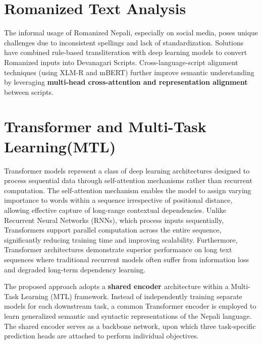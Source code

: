\section{Romanized Text Analysis}
The informal usage of Romanized Nepali, especially on social media, poses unique challenges due to inconsistent spellings and lack of standardization. Solutions have combined rule-based transliteration with deep learning models to convert Romanized inputs into Devanagari Scripts. Cross-language-script alignment techniques (using XLM-R and mBERT) further improve semantic understanding by leveraging \textbf{multi-head cross-attention and representation alignment} between scripts.


\section{Transformer and Multi-Task Learning(MTL)}
Transformer models represent a class of deep learning architectures designed to process sequential data through self-attention mechanisms rather than recurrent computation. The self-attention mechanism enables the model to assign varying importance to words within a sequence irrespective of positional distance, allowing effective capture of long-range contextual dependencies. Unlike Recurrent Neural Networks (RNNs), which process inputs sequentially, Transformers support parallel computation across the entire sequence, significantly reducing training time and improving scalability. Furthermore, Transformer architectures demonstrate superior performance on long text sequences where traditional recurrent models often suffer from information loss and degraded long-term dependency learning.

The proposed approach adopts a \textbf{shared encoder} architecture within a Multi-Task Learning (MTL) framework. Instead of independently training separate models for each downstream task, a common Transformer encoder is employed to learn generalized semantic and syntactic representations of the Nepali language. The shared encoder serves as a backbone network, upon which three task-specific prediction heads are attached to perform individual objectives.

